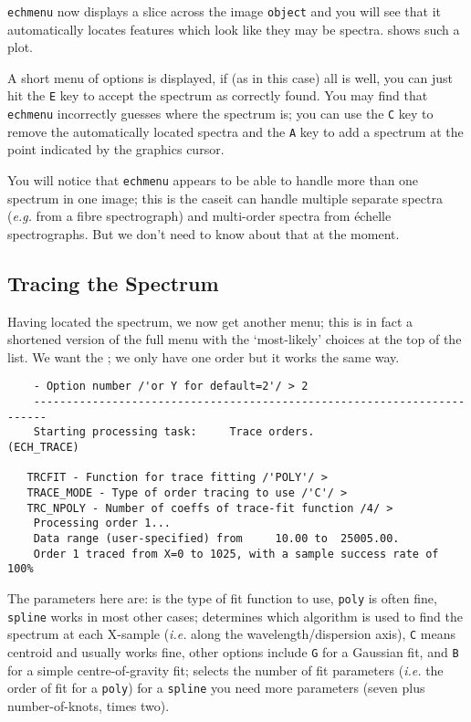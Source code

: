 \verb+echmenu+ now displays a slice across the image \verb+object+ and you
will see that it automatically locates features which look like they may be
spectra.   shows
such a plot.

A short menu of options is displayed, if (as in this case) all is well,
you can just hit the \verb+E+ key to accept the spectrum as correctly found.
You may find that \verb+echmenu+ incorrectly guesses where the spectrum is;
you can use the \verb+C+ key to remove the automatically located spectra and
the \verb+A+ key to add a spectrum at the point indicated by the graphics
cursor.

You will notice that \verb+echmenu+ appears to be able to handle more than
one spectrum in one image; this is the case\scspec{---}{ - }it can handle
multiple separate spectra ({\it{e.g.}} from a fibre spectrograph) and
multi-order spectra from \'{e}chelle spectrographs.  But we don't need to
know about that at the moment.


\subsection{Tracing the Spectrum}

Having located the spectrum, we now get another menu; this is in fact
a shortened version of the full menu with the `most-likely' choices at
the top of the list.
We want the ;
we only have one order but it works the same way.

{
\scspec{\small}{ }
\begin{verbatim}
    - Option number /'or Y for default=2'/ > 2
    ------------------------------------------------------------------------
    Starting processing task:     Trace orders.                  (ECH_TRACE)

   TRCFIT - Function for trace fitting /'POLY'/ >
   TRACE_MODE - Type of order tracing to use /'C'/ >
   TRC_NPOLY - Number of coeffs of trace-fit function /4/ >
    Processing order 1...
    Data range (user-specified) from     10.00 to  25005.00.
    Order 1 traced from X=0 to 1025, with a sample success rate of 100%
\end{verbatim}
}

The parameters here are:
 is the type of fit function to use,
\verb+poly+ is often fine, \verb+spline+ works in most other cases;
 determines which algorithm
is used to find the spectrum at each X-sample ({\it{i.e.}} along the
wavelength/dispersion axis), \verb+C+ means centroid and
usually works fine, other options include \verb+G+ for a Gaussian fit, and
\verb+B+ for a simple centre-of-gravity fit;
 selects the number of
fit parameters ({\it{i.e.}} the order of fit for a \verb+poly+) for
a \verb+spline+ you need more parameters (seven plus
number-of-knots, times two).

